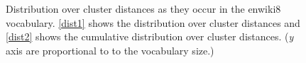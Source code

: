 \documentclass[11pt]{article}
\begin{document}
\begin{figure}
	\center
	\newline
	\caption{Distribution over cluster distances as they occur in the enwiki8 vocabulary. \ref{dist1} shows the distribution over cluster distances and \ref{dist2} shows the cumulative distribution over cluster distances. (\textit{y} axis are proportional to to the vocabulary size.)}
	\label{dist}
\end{figure}
\end{document}
